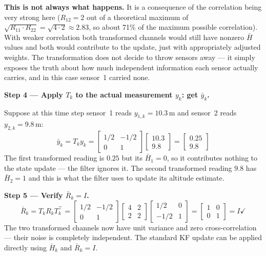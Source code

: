 \documentclass[12pt, a4paper]{article}
\begin{document}
\begin{notebox}
  \textbf{This is not always what happens.}
  It is a consequence of the correlation being very strong here
  ($R_{12} = 2$ out of a theoretical maximum of
  $\sqrt{R_{11} \cdot R_{22}} = \sqrt{4 \cdot 2} \approx 2.83$,
  so about 71\% of the maximum possible correlation).
  With weaker correlation both transformed channels would still have
  nonzero $\bar{H}$ values and both would contribute to the update,
  just with appropriately adjusted weights.
  The transformation does not decide to throw sensors away --- it simply
  exposes the truth about how much independent information each sensor
  actually carries, and in this case sensor~1 carried none.

  \textbf{Step 4 --- Apply $T_k$ to the actual measurement $y_k$: get
  $\bar{y}_k$.}

  Suppose at this time step sensor~1 reads $y_{1,k} = 10.3$\,m and
  sensor~2 reads $y_{2,k} = 9.8$\,m:
  \[
    \bar{y}_k = T_k y_k
    = \begin{bmatrix} 1/2 & -1/2 \\ 0 & 1 \end{bmatrix}
      \begin{bmatrix} 10.3 \\ 9.8 \end{bmatrix}
    = \begin{bmatrix} 0.25 \\ 9.8 \end{bmatrix}
  \]
  The first transformed reading is $0.25$ but its $\bar{H}_1 = 0$, so it
  contributes nothing to the state update --- the filter ignores it.
  The second transformed reading $9.8$ has $\bar{H}_2 = 1$ and this is
  what the filter uses to update its altitude estimate.

  \textbf{Step 5 --- Verify $\bar{R}_k = I$.}
  \[
    \bar{R}_k = T_k R_k T_k^\top
    = \begin{bmatrix} 1/2 & -1/2 \\ 0 & 1 \end{bmatrix}
      \begin{bmatrix} 4 & 2 \\ 2 & 2 \end{bmatrix}
      \begin{bmatrix} 1/2 & 0 \\ -1/2 & 1 \end{bmatrix}
    = \begin{bmatrix} 1 & 0 \\ 0 & 1 \end{bmatrix}
    = I \checkmark
  \]
  The two transformed channels now have unit variance and zero
  cross-correlation --- their noise is completely independent.
  The standard KF update can be applied directly using $\bar{H}_k$ and
  $\bar{R}_k = I$.


\end{notebox}
\end{document}
